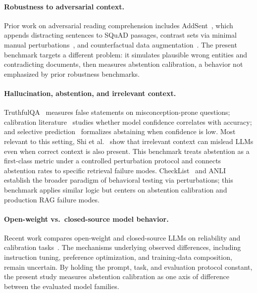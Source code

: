 \documentclass[11pt]{article}
\begin{document}
\paragraph{Robustness to adversarial context.}
Prior work on adversarial reading comprehension includes AddSent~\cite{jia2017adversarial},
which appends distracting sentences to SQuAD passages, contrast sets via minimal manual
perturbations~\cite{gardner2020contrast}, and counterfactual data
augmentation~\cite{kaushik2020counterfactual}. The present benchmark targets a different
problem: it simulates plausible wrong entities and contradicting documents, then measures
abstention calibration, a behavior not emphasized by prior robustness benchmarks.

\paragraph{Hallucination, abstention, and irrelevant context.}
TruthfulQA~\cite{lin2022truthfulqa} measures false statements on misconception-prone
questions; calibration literature~\cite{kadavath2022language, xiong2024can} studies
whether model confidence correlates with accuracy; and selective
prediction~\cite{geifman2017selective} formalizes abstaining when confidence is low. Most
relevant to this setting, Shi et al.~\cite{shi2023large} show that irrelevant context can
mislead LLMs even when correct context is also present. This benchmark treats abstention
as a first-class metric under a controlled perturbation protocol and connects abstention
rates to specific retrieval failure modes. CheckList~\cite{ribeiro2020checklist}
and ANLI~\cite{nie2020anli} establish the broader paradigm of behavioral testing via
perturbations; this benchmark applies similar logic but centers on abstention calibration
and production RAG failure modes.

\paragraph{Open-weight vs.\ closed-source model behavior.}
Recent work compares open-weight and closed-source LLMs on reliability and calibration
tasks~\cite{kadavath2022language, xiong2024can}. The mechanisms underlying observed
differences, including instruction tuning, preference optimization, and training-data
composition, remain uncertain. By holding the prompt, task, and evaluation protocol
constant, the present study measures abstention calibration as one axis of difference
between the evaluated model families.
\FloatBarrier
\end{document}
